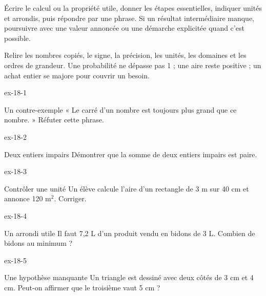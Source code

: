 \begin{savoirfaire}[Rédiger]Écrire le calcul ou la propriété utile, donner les étapes essentielles, indiquer unités et arrondis, puis répondre par une phrase. Si un résultat intermédiaire manque, poursuivre avec une valeur annoncée ou une démarche explicitée quand c’est possible.\end{savoirfaire}
\begin{savoirfaire}[Vérifier]Relire les nombres copiés, le signe, la précision, les unités, les domaines et les ordres de grandeur. Une probabilité ne dépasse pas 1 ; une aire reste positive ; un achat entier se majore pour couvrir un besoin.\end{savoirfaire}
\clearpage{}
\begin{blocLivre}{ex-18-1}\begin{exercice}[1]{Un contre-exemple}
« Le carré d’un nombre est toujours plus grand que ce nombre. » Réfuter cette phrase.
\end{exercice}\end{blocLivre}
\begin{blocLivre}{ex-18-2}\begin{exercice}[1]{Deux entiers impairs}
Démontrer que la somme de deux entiers impairs est paire.
\end{exercice}\end{blocLivre}
\begin{blocLivre}{ex-18-3}\begin{exercice}[1]{Contrôler une unité}
Un élève calcule l’aire d’un rectangle de 3 m sur 40 cm et annonce 120 m$^2$. Corriger.
\end{exercice}\end{blocLivre}
\begin{blocLivre}{ex-18-4}\begin{exercice}[1]{Un arrondi utile}
Il faut 7,2 L d’un produit vendu en bidons de 3 L. Combien de bidons au minimum ?
\end{exercice}\end{blocLivre}
\begin{blocLivre}{ex-18-5}\begin{exercice}[1]{Une hypothèse manquante}
Un triangle est dessiné avec deux côtés de 3 cm et 4 cm. Peut-on affirmer que le troisième vaut 5 cm ?
\end{exercice}\end{blocLivre}

